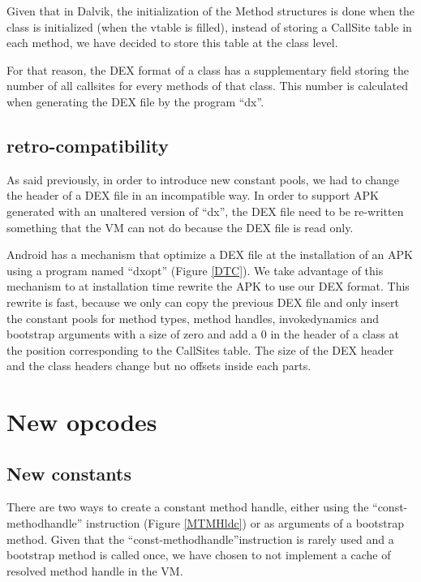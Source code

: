 \documentclass{sig-alternate}
\def \DALVIK{Dalvik\xspace}
\def \ANDROID{Android\xspace}
\begin{document}
    Given that in \DALVIK, the initialization of the Method structures is done when
    the class is initialized (when the vtable is filled), instead of storing a CallSite
    table in each method, we have decided to store this table at the class level.
    
    For that reason, the DEX format of a class has a supplementary field storing
    the number of all callsites for every methods of that class. 
    This number is calculated when generating the DEX file by the program ``dx''.

  \subsection{retro-compatibility}
    \label{retro}

    As said previously, in order to introduce new constant pools, we had to change
    the header of a DEX file in an incompatible way.
    In order to support APK generated with an unaltered version of ``dx'',
    the DEX file need to be re-written something that the VM can not do
    because the DEX file is read only.

    \ANDROID has a mechanism that optimize a DEX file at the installation of
    an APK using a program named ``dxopt'' (Figure \ref{DTC}).
    We take advantage of this mechanism to at installation time rewrite the APK to use our DEX format.
    This rewrite is fast, because we only can copy the previous DEX file and only insert the
    constant pools for method types, method handles, invokedynamics and
    bootstrap arguments with a size of zero and add a 0 in the header of a class at the
    position corresponding to the CallSites table.
    The size of the DEX header and the class headers change but no offsets inside each parts.

\section{New opcodes}
\label{newConst}
  \subsection{New constants}

    There are two ways to create a constant method handle, either using the ``const-methodhandle''
    instruction (Figure \ref{MTMHldc}) or as arguments of a bootstrap method.
    Given that the ``const-methodhandle''instruction is rarely used and
    a bootstrap method is called once, we have chosen to not implement a cache
    of resolved method handle in the VM.
\end{document}
